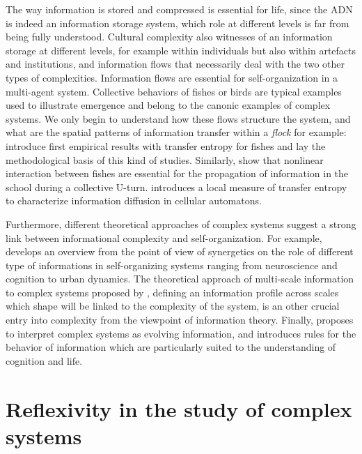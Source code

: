The way information is stored and compressed is essential for life, since the ADN is indeed an information storage system, which role at different levels is far from being fully understood. Cultural complexity also witnesses of an information storage at different levels, for example within individuals but also within artefacts and institutions, and information flows that necessarily deal with the two other types of complexities. Information flows are essential for self-organization in a multi-agent system. Collective behaviors of fishes or birds are typical examples used to illustrate emergence and belong to the canonic examples of complex systems. We only begin to understand how these flows structure the system, and what are the spatial patterns of information transfer within a \emph{flock} for example: \cite{crosato2017informative} introduce first empirical results with transfer entropy for fishes and lay the methodological basis of this kind of studies. Similarly, \cite{lecheval2018social} show that nonlinear interaction between fishes are essential for the propagation of information in the school during a collective U-turn. \cite{lizier2008local} introduces a local measure of transfer entropy to characterize information diffusion in cellular automatons.

Furthermore, different theoretical approaches of complex systems suggest a strong link between informational complexity and self-organization. For example, \cite{e18060197} develops an overview from the point of view of synergetics on the role of different type of informations in self-organizing systems ranging from neuroscience and cognition to urban dynamics. The theoretical approach of multi-scale information to complex systems proposed by \cite{allen2017multiscale}, defining an information profile across scales which shape will be linked to the complexity of the system, is an other crucial entry into complexity from the viewpoint of information theory. Finally, \cite{gershenson2012world} proposes to interpret complex systems as evolving information, and introduces rules for the behavior of information which are particularly suited to the understanding of cognition and life. 



\section{Reflexivity in the study of complex systems}





